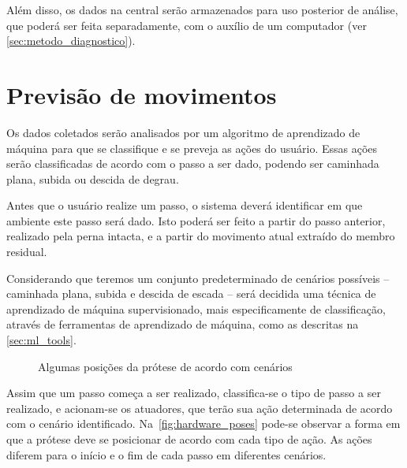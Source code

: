 Além disso, os dados na central serão armazenados para uso posterior de análise, que poderá ser feita separadamente, com o auxílio de um computador (ver \autoref{sec:metodo_diagnostico}).

\section{Previsão de movimentos}\label{sec:metodo_previsao}
Os dados coletados serão analisados por um algoritmo de aprendizado de máquina para que se classifique e se preveja as ações do usuário. Essas ações serão classificadas de acordo com o passo a ser dado, podendo ser caminhada plana, subida ou descida de degrau.

Antes que o usuário realize um passo, o sistema deverá identificar em que ambiente este passo será dado. Isto poderá ser feito a partir do passo anterior, realizado pela perna intacta, e a partir do movimento atual extraído do membro residual.

Considerando que teremos um conjunto predeterminado de cenários possíveis -- caminhada plana, subida e descida de escada -- será decidida uma técnica de aprendizado de máquina supervisionado, mais especificamente de classificação, através de ferramentas de aprendizado de máquina, como as descritas na \autoref{sec:ml_tools}.

\begin{figure}[h]
	\caption{\label{fig:hardware_poses}Algumas posições da prótese de acordo com cenários}
	\begin{center}
	\end{center}
\end{figure}

Assim que um passo começa a ser realizado, classifica-se o tipo de passo a ser realizado, e acionam-se os atuadores, que terão sua ação determinada de acordo com o cenário identificado. Na~\autoref{fig:hardware_poses} pode-se observar a forma em que a prótese deve se posicionar de acordo com cada tipo de ação. As ações diferem para o início e o fim de cada passo em diferentes cenários.

